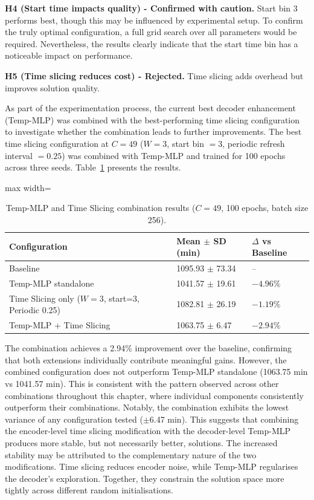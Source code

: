 \textbf{H4 (Start time impacts quality) - Confirmed with caution.} Start bin 3 performs
best, though this may be influenced by experimental setup. To confirm the truly optimal
configuration, a full grid search over all parameters would be required. Nevertheless, the
results clearly indicate that the start time bin has a noticeable impact on performance.

\textbf{H5 (Time slicing reduces cost) - Rejected.} Time slicing adds overhead but
improves solution quality.

As part of the experimentation process, the current best decoder enhancement (Temp-MLP) was
combined with the best-performing time slicing configuration to investigate whether the
combination leads to further improvements. The best time slicing configuration at $C = 49$
($W = 3$, start bin $= 3$, periodic refresh interval $= 0.25$) was combined with Temp-MLP
and trained for 100 epochs across three seeds. Table~\ref{tab:temp_mlp_combo} presents the
results.

\begin{table}[H]
\centering
\caption{Temp-MLP and Time Slicing combination results ($C = 49$, 100 epochs, batch size 256).}
\label{tab:temp_mlp_combo}
\begin{adjustbox}{max width=\textwidth}
\begin{tabular}{lll}
\toprule
\textbf{Configuration} & \textbf{Mean $\pm$ SD (min)} & \textbf{$\Delta$ vs Baseline} \\
\midrule
Baseline                                    & 1095.93 $\pm$ 73.34 & -- \\
Temp-MLP standalone                         & 1041.57 $\pm$ 19.61 & $-4.96\%$ \\
Time Slicing only ($W=3$, start=3, Periodic 0.25) & 1082.81 $\pm$ 26.19 & $-1.19\%$ \\
Temp-MLP + Time Slicing                     & 1063.75 $\pm$ 6.47  & $-2.94\%$ \\
\bottomrule
\end{tabular}
\end{adjustbox}
\end{table}

The combination achieves a 2.94\% improvement over the baseline, confirming that both
extensions individually contribute meaningful gains. However, the combined configuration does
not outperform Temp-MLP standalone (1063.75 min vs 1041.57 min). This is consistent with the
pattern observed across other combinations throughout this chapter, where individual components
consistently outperform their combinations. Notably, the combination exhibits the lowest
variance of any configuration tested ($\pm$6.47 min). This suggests that combining the
encoder-level time slicing modification with the decoder-level Temp-MLP produces more stable,
but not necessarily better, solutions. The increased stability may be attributed to the
complementary nature of the two modifications. Time slicing reduces encoder noise, while
Temp-MLP regularises the decoder's exploration. Together, they constrain the solution space
more tightly across different random initialisations.

